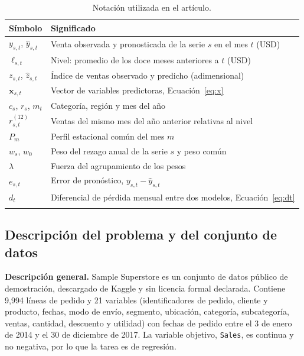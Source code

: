 \documentclass[pdflatex,sn-mathphys-num]{sn-jnl}
\theoremstyle{thmstyleone}
\begin{document}
\begin{table}[!htb]
\caption{Notación utilizada en el artículo.}\label{tab:notacion}
\begin{tabular}{@{}ll@{}}
\toprule
Símbolo & Significado \\
\midrule
$y_{s,t}$, $\hat{y}_{s,t}$ & Venta observada y pronosticada de la serie $s$ en el mes $t$ (USD) \\
$\ell_{s,t}$ & Nivel: promedio de los doce meses anteriores a $t$ (USD) \\
$z_{s,t}$, $\hat{z}_{s,t}$ & Índice de ventas observado y predicho (adimensional) \\
$\mathbf{x}_{s,t}$ & Vector de variables predictoras, Ecuación~\eqref{eq:x} \\
$c_s$, $r_s$, $m_t$ & Categoría, región y mes del año \\
$r^{(12)}_{s,t}$ & Ventas del mismo mes del año anterior relativas al nivel \\
$P_m$ & Perfil estacional común del mes $m$ \\
$w_s$, $w_0$ & Peso del rezago anual de la serie $s$ y peso común \\
$\lambda$ & Fuerza del agrupamiento de los pesos \\
$e_{s,t}$ & Error de pronóstico, $y_{s,t}-\hat{y}_{s,t}$ \\
$d_t$ & Diferencial de pérdida mensual entre dos modelos, Ecuación~\eqref{eq:dt} \\
\botrule
\end{tabular}
\end{table}

\subsection{Descripción del problema y del conjunto de datos}\label{subsec:datos}

\textbf{Descripción general.} Sample Superstore \cite{superstore} es un conjunto de datos público de demostración, descargado de Kaggle y sin licencia formal declarada. Contiene 9{,}994 líneas de pedido y 21 variables (identificadores de pedido, cliente y producto, fechas, modo de envío, segmento, ubicación, categoría, subcategoría, ventas, cantidad, descuento y utilidad) con fechas de pedido entre el 3 de enero de 2014 y el 30 de diciembre de 2017. La variable objetivo, \texttt{Sales}, es continua y no negativa, por lo que la tarea es de regresión.
\end{document}
